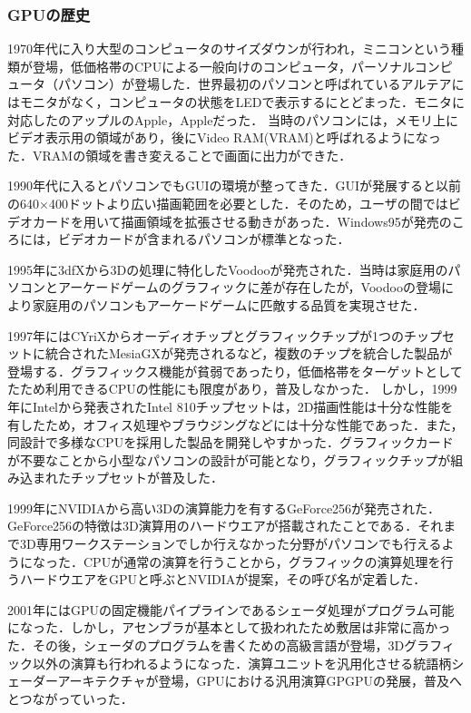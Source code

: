 \documentclass[a4j,12pt]{jsarticle}
\begin{document}
\subsubsection{GPUの歴史}
1970年代に入り大型のコンピュータのサイズダウンが行われ，ミニコンという種類が登場，低価格帯のCPUによる一般向けのコンピュータ，パーソナルコンピュータ（パソコン）が登場した．世界最初のパソコンと呼ばれているアルテアにはモニタがなく，コンピュータの状態をLEDで表示するにとどまった．モニタに対応したのアップルのApple，Appleだった．
当時のパソコンには，メモリ上にビデオ表示用の領域があり，後にVideo RAM(VRAM)と呼ばれるようになった．VRAMの領域を書き変えることで画面に出力ができた．

1990年代に入るとパソコンでもGUIの環境が整ってきた．GUIが発展すると以前の640×400ドットより広い描画範囲を必要とした．そのため，ユーザの間ではビデオカードを用いて描画領域を拡張させる動きがあった．Windows95が発売のころには，ビデオカードが含まれるパソコンが標準となった．

1995年に3dfXから3Dの処理に特化したVoodooが発売された．当時は家庭用のパソコンとアーケードゲームのグラフィックに差が存在したが，Voodooの登場により家庭用のパソコンもアーケードゲームに匹敵する品質を実現させた．

1997年にはCYriXからオーディオチップとグラフィックチップが1つのチップセットに統合されたMesiaGXが発売されるなど，複数のチップを統合した製品が登場する．グラフィックス機能が貧弱であったり，低価格帯をターゲットとしてたため利用できるCPUの性能にも限度があり，普及しなかった．
しかし，1999年にIntelから発表されたIntel 810チップセットは，2D描画性能は十分な性能を有したため，オフィス処理やブラウジングなどには十分な性能であった．また，同設計で多様なCPUを採用した製品を開発しやすかった．グラフィックカードが不要なことから小型なパソコンの設計が可能となり，グラフィックチップが組み込まれたチップセットが普及した．

1999年にNVIDIAから高い3Dの演算能力を有するGeForce256が発売された．GeForce256の特徴は3D演算用のハードウエアが搭載されたことである．それまで3D専用ワークステーションでしか行えなかった分野がパソコンでも行えるようになった．CPUが通常の演算を行うことから，グラフィックの演算処理を行うハードウエアをGPUと呼ぶとNVIDIAが提案，その呼び名が定着した．

2001年にはGPUの固定機能パイプラインであるシェーダ処理がプログラム可能になった．しかし，アセンブラが基本として扱われたため敷居は非常に高かった．その後，シェーダのプログラムを書くための高級言語が登場，3Dグラフィック以外の演算も行われるようになった．演算ユニットを汎用化させる統語柄シェーダーアーキテクチャが登場，GPUにおける汎用演算GPGPUの発展，普及へとつながっていった．
\end{document}
